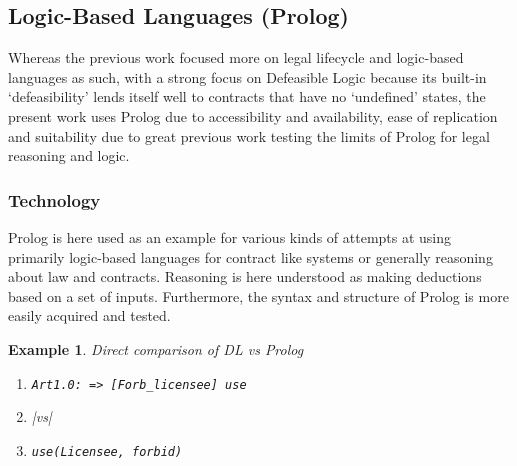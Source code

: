 \documentclass[conference]{IEEEtran}
\newtheorem{example}{Example}
\begin{document}
\subsection{Logic-Based Languages (Prolog) }
Whereas the previous work \cite{governatoriLegalContractsImperative2018} focused more on legal lifecycle and logic-based languages as such, with a strong focus on Defeasible Logic because its built-in ‘defeasibility’ lends itself well to contracts that have no ‘undefined’ states, the present work uses Prolog due to accessibility and availability, ease of replication and suitability due to great previous work testing the limits of Prolog for legal reasoning and logic.

\subsubsection{Technology}
Prolog is here used as an example for various kinds of attempts at using primarily logic-based languages for contract like systems or generally reasoning about law and contracts. Reasoning is here understood as making deductions based on a set of inputs.
Furthermore, the syntax and structure of Prolog is more easily acquired and tested.%
\begin{example}\label{ex:dl_vs_prolo}
Direct comparison of DL vs Prolog
\begin{enumerate}[label={},leftmargin=*]
\item[] \verb|Art1.0: => [Forb_licensee] use|
\item[] |vs|
\item[] \verb|use(Licensee, forbid)|
\end{enumerate}
\end{example}
\end{document}
